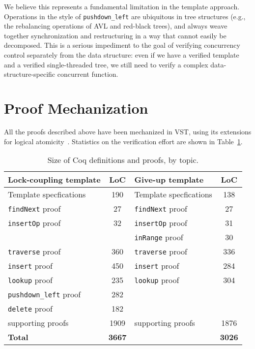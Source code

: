 \documentclass[a4paper,UKenglish,cleveref, autoref, thm-restate]{lipics-v2021}
\begin{document}
We believe this represents a fundamental limitation in the template approach. Operations in the style of \lstinline{pushdown_left} are ubiquitous in tree structures (e.g., the rebalancing operations of AVL and red-black trees), and always weave together synchronization and restructuring in a way that cannot easily be decomposed. This is a serious impediment to the goal of verifying concurrency control separately from the data structure: even if we have a verified template and a verified single-threaded tree, we still need to verify a complex data-structure-specific concurrent function. %

\section{Proof Mechanization}
\label{proof_mech}
All the proofs described above have been mechanized in VST, using its extensions for logical atomicity~\cite{iris-vst-arxiv}. Statistics on the verification effort are shown in Table~\ref{table_coq}.

\begin{table}[h]
	\begin{center}
		\begin{tabular}{l | c || l | c } 
			\hline
			\textbf{Lock-coupling template} & \textbf{LoC} & \textbf{Give-up  template} & \textbf{LoC} \\
			\hline
			Template specfications & 190 & Template specfications & 138 \\
			\texttt{findNext} proof 	& 27  & \texttt{findNext} proof & 27 \\
			\texttt{insertOp} proof 	& 32  & \texttt{insertOp} proof & 31 \\
			& & \texttt{inRange} proof & 30 \\
			\texttt{traverse} proof	& 360  & \texttt{traverse} proof & 336 \\ 
			\texttt{insert} proof 	   		& 450  & \texttt{insert} proof & 284 \\
			\texttt{lookup} proof 	   	& 235  &  \texttt{lookup} proof & 304 \\ 
			\texttt{pushdown\_left} proof 	   	& 282 & & \\	
			\texttt{delete} proof 		& 182	 &   & 	 \\
			supporting proofs    & 	1909	 & supporting proofs 	& 1876 \\
			\hline
			\textbf{Total} & \textbf{3667} & & \textbf{3026}  
		\end{tabular}
		\caption{Size of Coq definitions and proofs, by topic.}
		\label{table_coq}
	\end{center}
\end{table}
\end{document}

